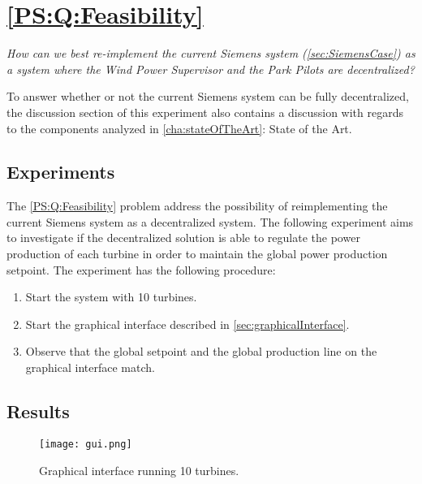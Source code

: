 
\section{\ref{PS:Q:Feasibility}}

\textit{How can we best re-implement the current Siemens system (\cref{sec:SiemensCase}) as a system where the Wind Power Supervisor and the Park Pilots are decentralized?}\newline\newline

\noindent To answer whether or not the current Siemens system can be fully decentralized, the discussion section of this experiment also contains a discussion with regards to the components analyzed in \cref{cha:stateOfTheArt}: State of the Art.

\subsection{Experiments}

The \ref{PS:Q:Feasibility} problem address the possibility of reimplementing the current Siemens system as a decentralized system. The following experiment aims to investigate if the decentralized solution is able to regulate the power production of each turbine in order to maintain the global power production setpoint.
%
The experiment has the following procedure:
\begin{enumerate}
	\item Start the system with 10 turbines.
	\item Start the graphical interface described in \cref{sec:graphicalInterface}.
	\item Observe that the global setpoint and the global production line on the graphical interface match.
\end{enumerate}

\subsection{Results}
\label{sec:exp:feasibility}
\begin{figure} [!h]
	\centering
	\texttt{[image: gui.png]} 
	\caption[Graphical interface running 10 turbines]{
		\label{fig:graphicalInterface} 
		\footnotesize{%
			Graphical interface running 10 turbines.
		}
	}
\end{figure}

